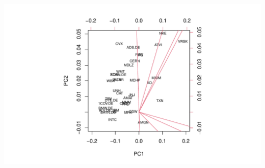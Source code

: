 \documentclass[
]{article}
\newenvironment{Shaded}{\begin{snugshade}}{\end{snugshade}}
\newcommand{\KeywordTok}[1]{\textcolor[rgb]{0.13,0.29,0.53}{\textbf{#1}}}
\newcommand{\NormalTok}[1]{#1}
\newcommand{\OperatorTok}[1]{\textcolor[rgb]{0.81,0.36,0.00}{\textbf{#1}}}
\newcommand{\StringTok}[1]{\textcolor[rgb]{0.31,0.60,0.02}{#1}}
\begin{document}
\includegraphics{ass2_files/figure-latex/value-1.pdf}

\begin{Shaded}
\end{Shaded}
\end{document}
